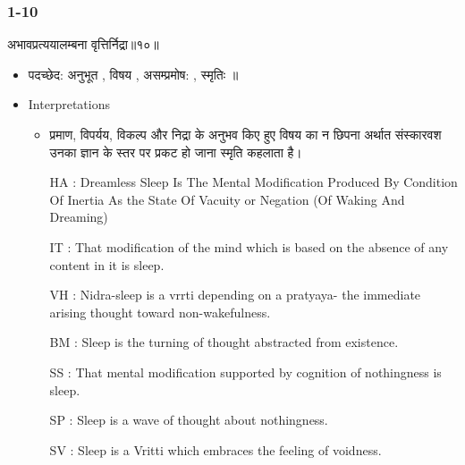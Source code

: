 \begin{frame}[fragile]\frametitle{1-10}

\begin{sanskrit}
अभावप्रत्ययालम्बना वृत्तिर्निद्रा॥१०॥
\end{sanskrit}

	\begin{itemize}
	\item पदच्छेद: अनुभूत , विषय , असम्प्रमोष: , स्मृतिः ॥
	\item Interpretations
		\begin{itemize}		
		\item प्रमाण, विपर्यय, विकल्प और निद्रा के अनुभव किए हुए विषय का न छिपना अर्थात संस्कारवश उनका ज्ञान के स्तर पर प्रकट हो जाना स्मृति कहलाता है।
		\item [HA]: Dreamless Sleep Is The Mental Modification Produced By Condition Of Inertia As the State Of Vacuity or Negation (Of Waking And Dreaming)
		\item [IT]: That modification of the mind which is based on the absence of any content in it is sleep.
		\item [VH]: Nidra-sleep is a vrrti depending on a pratyaya- the immediate arising thought toward non-wakefulness.
		\item [BM]: Sleep is the turning of thought abstracted from existence.
		\item [SS]: That mental modification supported by cognition of nothingness is sleep.
		\item [SP]: Sleep is a wave of thought about nothingness.
		\item [SV]: Sleep is a Vritti which embraces the feeling of voidness. 
		\end{itemize}
	\end{itemize}
	
\end{frame}



